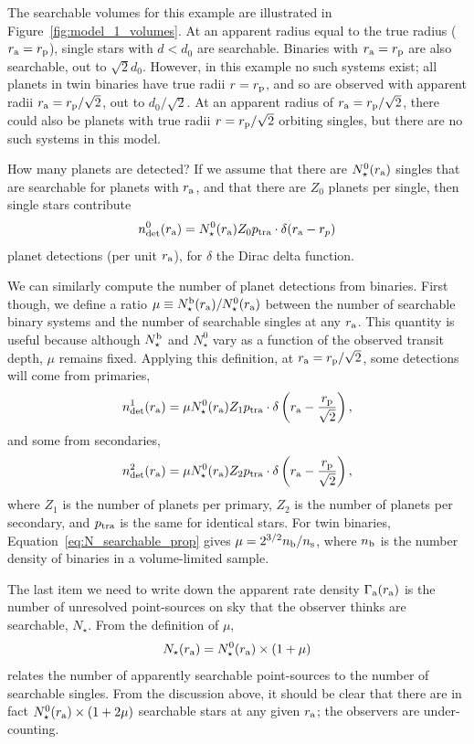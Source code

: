 \documentclass[12pt,modern]{aastex61}
\renewcommand{\a}{_{\rm a}}
\newcommand{\p}{_{\rm p}}
\begin{document}
The searchable volumes for this example are illustrated in 
Figure~\ref{fig:model_1_volumes}.
At an apparent radius equal to the true radius ($r\a=r\p$), single stars 
with $d<d_0$ are searchable.
Binaries with $r\a=r\p$ are also searchable, out to $\sqrt{2}d_0$. 
However, in this example no such systems exist; all planets in twin binaries 
have true radii $r=r\p$, and so are observed with apparent radii 
$r\a=r\p/\sqrt{2}$, out to $d_0/\sqrt{2}$.
At an apparent radius of $r\a=r\p/\sqrt{2}$, there could also be planets with 
true radii $r=r\p/\sqrt{2}$ orbiting singles, but there are no such systems 
in this model.

How many planets are detected?
If we assume that there are $N_\star^0(r\a)$ singles that are searchable for 
planets with $r\a$, and that there are $Z_0$ planets per single, then 
single stars contribute
\begin{equation}
n_{\rm det}^0(r\a) = N_\star^0(r\a) Z_0 p_{\rm tra} \cdot \delta(r\a - r_p)
\end{equation}
planet detections (per unit $r\a$), for $\delta$ the Dirac delta function.

We can similarly compute the number of planet detections from binaries.
First though, we define a ratio $\mu \equiv N_\star^{\rm b}(r\a) / 
N_\star^0(r\a)$ 
between the number of searchable binary systems and the number of searchable 
singles at any $r\a$.
This quantity is useful because although $N_\star^{\rm b}$ and $N_\star^0$ vary
as a function of the observed transit depth, $\mu$ remains fixed.
Applying this definition, at $r\a=r\p/\sqrt{2}$, some detections will come 
from primaries,
\begin{equation}
n_{\rm det}^1(r\a) =
\mu N_\star^0(r\a) Z_1 p_{\rm tra}
\cdot \delta\left(r\a - \frac{r\p}{\sqrt{2}}\right),
\end{equation}
and some from secondaries,
\begin{equation}
n_{\rm det}^2(r\a) = 
\mu N_\star^0(r\a) Z_2 p_{\rm tra}
\cdot \delta\left(r\a - \frac{r\p}{\sqrt{2}}\right),
\end{equation}
where $Z_1$ is the number of planets per primary, $Z_2$ is the number of 
planets per secondary, and $p_{\rm tra}$ is the same for identical stars.
For twin binaries, Equation~\ref{eq:N_searchable_prop} gives $\mu = 
2^{3/2} n_{\rm b}/n_{\rm s}$, where $n_{\rm b}$ is the number density of 
binaries in a volume-limited sample.

The last item we need to write down the apparent rate density $\Gamma\a(r\a)$ 
is the number of unresolved point-sources on sky that the observer thinks are 
searchable, $N_\star$.
From the definition of $\mu$,
\begin{equation}
N_\star(r\a) = N_\star^0(r\a) \times (1 + \mu)
\label{eq:apparentlysearchable_to_searchable}
\end{equation}
relates the number of apparently searchable point-sources to the number of 
searchable singles.
From the discussion above, it should be clear that there are in fact
$N_\star^0(r\a)\times (1 + 2\mu)$ searchable stars at any given $r\a$; the 
observers are under-counting.
\end{document}

